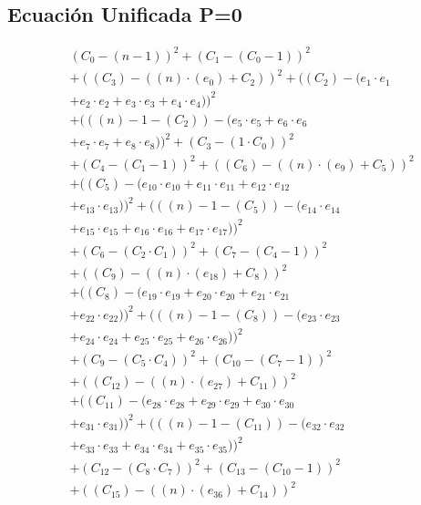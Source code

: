 \documentclass[10pt, a4paper]{article}
\begin{document}
\subsection*{Ecuación Unificada P=0}
\begin{align*}
& (C_{0} - (n - 1))^{2} + (C_{1} - (C_{0} - 1))^{2} \\
& + ((C_{3}) - ((n)  \cdot  (e_{0}) + C_{2}))^{2} + ((C_{2}) - (e_{1} \cdot e_{1} \\
& + e_{2} \cdot e_{2} + e_{3} \cdot e_{3} + e_{4} \cdot e_{4}))^{2} \\
& + (((n) - 1 - (C_{2})) - (e_{5} \cdot e_{5} + e_{6} \cdot e_{6} \\
& + e_{7} \cdot e_{7} + e_{8} \cdot e_{8}))^{2} + (C_{3} - (1  \cdot  C_{0}))^{2} \\
& + (C_{4} - (C_{1} - 1))^{2} + ((C_{6}) - ((n)  \cdot  (e_{9}) + C_{5}))^{2} \\
& + ((C_{5}) - (e_{10} \cdot e_{10} + e_{11} \cdot e_{11} + e_{12} \cdot e_{12} \\
& + e_{13} \cdot e_{13}))^{2} + (((n) - 1 - (C_{5})) - (e_{14} \cdot e_{14} \\
& + e_{15} \cdot e_{15} + e_{16} \cdot e_{16} + e_{17} \cdot e_{17}))^{2} \\
& + (C_{6} - (C_{2}  \cdot  C_{1}))^{2} + (C_{7} - (C_{4} - 1))^{2} \\
& + ((C_{9}) - ((n)  \cdot  (e_{18}) + C_{8}))^{2} \\
& + ((C_{8}) - (e_{19} \cdot e_{19} + e_{20} \cdot e_{20} + e_{21} \cdot e_{21} \\
& + e_{22} \cdot e_{22}))^{2} + (((n) - 1 - (C_{8})) - (e_{23} \cdot e_{23} \\
& + e_{24} \cdot e_{24} + e_{25} \cdot e_{25} + e_{26} \cdot e_{26}))^{2} \\
& + (C_{9} - (C_{5}  \cdot  C_{4}))^{2} + (C_{10} - (C_{7} - 1))^{2} \\
& + ((C_{12}) - ((n)  \cdot  (e_{27}) + C_{11}))^{2} \\
& + ((C_{11}) - (e_{28} \cdot e_{28} + e_{29} \cdot e_{29} + e_{30} \cdot e_{30} \\
& + e_{31} \cdot e_{31}))^{2} + (((n) - 1 - (C_{11})) - (e_{32} \cdot e_{32} \\
& + e_{33} \cdot e_{33} + e_{34} \cdot e_{34} + e_{35} \cdot e_{35}))^{2} \\
& + (C_{12} - (C_{8}  \cdot  C_{7}))^{2} + (C_{13} - (C_{10} - 1))^{2} \\
& + ((C_{15}) - ((n)  \cdot  (e_{36}) + C_{14}))^{2} \\

\end{align*}
\end{document}
